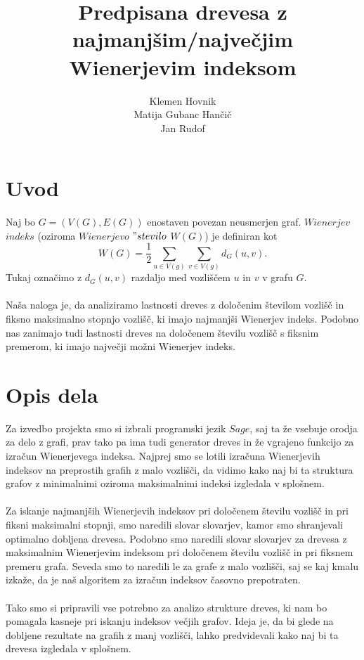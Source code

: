 \documentclass[a4paper]{article}
\title{Predpisana drevesa z najmanjšim/največjim Wienerjevim indeksom}
\author{Klemen Hovnik\\ Matija Gubanc Hančič \\ Jan Rudof}
\begin{document}
\maketitle

\section{Uvod}

Naj bo $G=(V(G),  E(G))$ enostaven povezan neusmerjen graf. $Wienerjev$ $ indeks$ (oziroma $Wienerjevo$  $"stevilo$ $ W(G)$) je definiran kot
\begin{equation}
W(G) = \frac{1}{2}\sum_{u\in V(g)}\sum_{v\in V(g)} d_G(u,v).
\end{equation}
Tukaj označimo z $d_G(u,v)$ razdaljo med vozliščem $u$ in $v$ v grafu $G$. 
\\
\\
Naša naloga je, da analiziramo lastnosti dreves z določenim številom vozlišč in 
fiksno maksimalno stopnjo vozlišč, ki imajo najmanjši Wienerjev indeks. Podobno nas zanimajo tudi lastnosti 
dreves na določenem številu vozlišč s fiksnim premerom, ki imajo največji možni Wienerjev indeks.

\section{Opis dela}

Za izvedbo projekta smo si izbrali programski jezik $Sage$, saj ta že vsebuje orodja za delo z grafi, prav tako 
pa ima tudi generator dreves in že vgrajeno funkcijo za izračun Wienerjevega indeksa. Najprej smo se lotili 
izračuna Wienerjevih indeksov na preprostih grafih z malo vozlišči, da vidimo kako naj bi ta struktura grafov 
z minimalnimi oziroma maksimalnimi indeksi izgledala v splošnem. 
\\
\\
Za iskanje najmanjših Wienerjevih indeksov pri določenem številu vozlišč in pri fiksni maksimalni stopnji, 
smo naredili slovar slovarjev, kamor smo shranjevali optimalno dobljena drevesa. Podobno smo naredili 
slovar slovarjev za drevesa z maksimalnim Wienerjevim indeksom pri določenem številu vozlišč in pri 
fiksnem premeru grafa. Seveda smo to naredili le za grafe z malo vozlišči, saj se kaj kmalu izkaže, da je 
naš algoritem za izračun indeksov časovno prepotraten.
\\
\\
Tako smo si pripravili vse potrebno za analizo strukture dreves, ki nam bo pomagala kasneje pri iskanju 
indeksov večjih grafov. Ideja je, da bi glede na dobljene rezultate na grafih z manj vozlišči, lahko predvidevali
 kako naj bi ta drevesa izgledala v splošnem.
\end{document}
